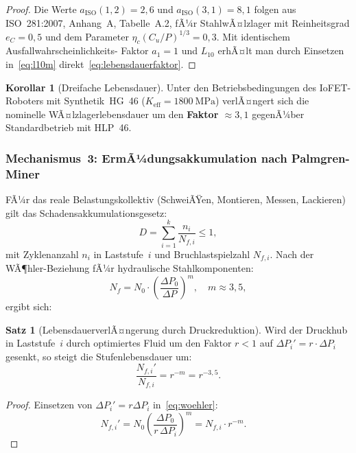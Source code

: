 ﻿\documentclass[a4paper,12pt]{scrreprt}
\theoremstyle{definition}
\newtheorem{satz}{Satz}[section]
\newtheorem{korollar}{Korollar}[section]
\begin{document}
\begin{proof}
Die Werte $a_{\text{ISO}}(1{,}2) = 2{,}6$ und $a_{\text{ISO}}(3{,}1) = 8{,}1$
folgen aus ISO~281:2007, Anhang~A, Tabelle~A.2, fÃ¼r StahlwÃ¤lzlager mit
Reinheitsgrad $e_C = 0{,}5$ und dem Parameter
$\eta_c (C_u/P)^{1/3} = 0{,}3$. Mit identischem Ausfallwahrscheinlichkeits-
Faktor $a_1 = 1$ und $L_{10}$ erhÃ¤lt man durch Einsetzen
in~\eqref{eq:l10m} direkt~\eqref{eq:lebensdauerfaktor}.
\end{proof}

\begin{korollar}[Dreifache Lebensdauer]
\label{kor:3x}
Unter den Betriebsbedingungen des IoFET-Roboters mit Synthetik~HG~46
($K_{\text{eff}} = \SI{1800}{\mega\pascal}$)
verlÃ¤ngert sich die nominelle WÃ¤lzlagerlebensdauer um
den \textbf{Faktor $\approx 3{,}1$} gegenÃ¼ber Standardbetrieb mit HLP~46.
\end{korollar}

\subsubsection{Mechanismus~3: ErmÃ¼dungsakkumulation nach Palmgren-Miner}

FÃ¼r das reale Belastungskollektiv (SchweiÃŸen, Montieren, Messen, Lackieren)
gilt das Schadensakkumulationsgesetz:
\begin{equation}
  D = \sum_{i=1}^{k} \frac{n_i}{N_{f,i}} \leq 1,
  \label{eq:miner}
\end{equation}
mit Zyklenanzahl $n_i$ in Laststufe~$i$ und Bruchlastspielzahl $N_{f,i}$.
Nach der WÃ¶hler-Beziehung fÃ¼r hydraulische Stahlkomponenten:
\begin{equation}
  N_f = N_0 \cdot \left(\frac{\Delta P_0}{\Delta P}\right)^{m},
  \quad m \approx 3{,}5,
  \label{eq:woehler}
\end{equation}
ergibt sich:

\begin{satz}[LebensdauerverlÃ¤ngerung durch Druckreduktion]
\label{satz:druckleben}
Wird der Druckhub in Laststufe~$i$ durch optimiertes Fluid um den
Faktor $r < 1$ auf $\Delta P_i' = r \cdot \Delta P_i$ gesenkt,
so steigt die Stufenlebensdauer um:
\begin{equation}
  \frac{N_{f,i}'}{N_{f,i}} = r^{-m} = r^{-3{,}5}.
  \label{eq:lebensteigerung}
\end{equation}
\end{satz}

\begin{proof}
Einsetzen von $\Delta P_i' = r \Delta P_i$ in~\eqref{eq:woehler}:
\begin{equation*}
N_{f,i}' = N_0 \left(\frac{\Delta P_0}{r\,\Delta P_i}\right)^m
         = N_{f,i} \cdot r^{-m}.\quad
\end{equation*}
\end{proof}
\end{document}
